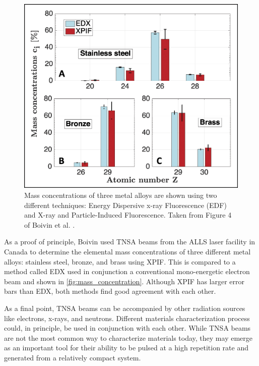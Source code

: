 \begin{figure}
	\centering
	\includegraphics[width=0.6\linewidth]{planning/images/mass_concentration.jpg}
	\caption{Mass concentrations of three metal alloys are shown using two different techniques: Energy Dispersive x-ray Fluorescence (EDF) and X-ray and Particle-Induced Fluorescence. Taken from Figure 4 of Boivin et al. \cite{Boivin_2022_NJoP}.}
	\label{fig:mass_concentration}
\end{figure}

As a proof of principle, Boivin \cite{Boivin_2022_NJoP} used TNSA beams from the \gls{ALLS} laser facility in Canada to determine the elemental mass concentrations of three different metal alloys: stainless steel, bronze, and  brass using \gls{XPIF}. This is compared to a method called \gls{EDX} used in conjunction a conventional mono-energetic electron beam and shown in \autoref{fig:mass_concentration}. Although XPIF has larger error bars than \gls{EDX}, both methods find good agreement with each other.

As a final point, \gls{TNSA} beams can be accompanied by other radiation sources like electrons, x-rays, and neutrons. Different materials characterization process could, in principle, be used in conjunction with each other. While \gls{TNSA} beams are not the most common way to characterize materials today, they may emerge as an important tool for their ability to be pulsed at a high repetition rate and generated from a relatively compact system.

